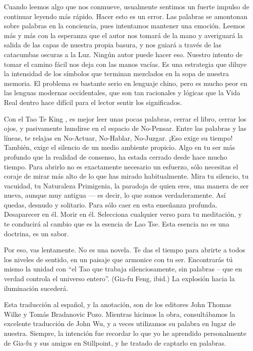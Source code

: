 \documentclass[hidelinks]{memoir}
\begin{document}
	Cuando leemos algo que nos conmueve, usualmente sentimos un fuerte
	impulso de continuar leyendo más rápido. Hacer esto es un error. Las
	palabras se amontonan sobre palabras en la conciencia, pues intentamos
	mantener una emoción. Leemos más y más con la esperanza que el autor nos
	tomará de la mano y averiguará la salida de las capas de nuestra propia
	basura, y nos guiará a través de las catacumbas oscuras a la Luz. Ningún
	autor puede hacer eso. Nuestro intento de tomar el camino fácil nos deja
	con las manos vacías. Es una estrategia que diluye la intensidad de los
	símbolos que terminan mezclados en la sopa de nuestra memoria. El
	problema es bastante serio en lenguaje chino, pero es mucho peor en las
	lenguas modernas occidentales, que son tan racionales y lógicas que la
	Vida Real dentro hace difícil para el lector sentir los significados.
	
	Con el Tao Te King , es mejor leer unas pocas palabras, cerrar el libro,
	cerrar los ojos, y pasivamente hundirse en el espacio de No-Pensar.
	Entre las palabras y las líneas, te relajas en No-Actuar, No-Hablar,
	No-Juzgar. ¡Eso exige su tiempo! También, exige el silencio de un medio
	ambiente propicio. Algo en tu ser más profundo que la realidad de
	consenso, ha estada cerrado desde hace mucho tiempo. Para abrirlo no es
	exactamente necesario un esfuerzo, sólo necesitas el coraje de mirar más
	alto de lo que has mirado habitualmente. Mira tu silencio, tu vacuidad,
	tu Naturaleza Primigenia, la paradoja de quien eres, una manera de ser
	nueva, aunque muy antigua --- es decir, lo que somos verdaderamente. Así
	quedas, desnudo y solitario. Para sólo caer en esta enseñanza profunda.
	Desaparecer en él. Morir en él. Selecciona cualquier verso para tu
	meditación, y te conducirá al cambio que es la esencia de Lao Tse. Esta
	esencia no es una doctrina, es un sabor.
	
	Por eso, vas lentamente. No es una novela. Te das el tiempo para abrirte
	a todos los niveles de sentido, en un paisaje que armonice con tu ser.
	Encontrarás tú mismo la unidad con ``el Tao que trabaja silenciosamente,
	sin palabras -- que en verdad controla el universo entero''. (Gia-fu
	Feng, ibid.) La explosión hacia la iluminación sucederá.
	
	Esta traducción al español, y la anotación, son de los editores John
	Thomas Wilke y Tomás Bradanovic Pozo. Mientras hicimos la obra,
	consultábamos la excelente traducción de John Wu, y a veces utilizamos
	su palabra en lugar de nuestra. Siempre, la intención fue recordar lo
	que yo he aprendido personalmente de Gia-fu y sus amigos en Stillpoint,
	y he tratado de captarlo en palabras.
	
\end{document}
